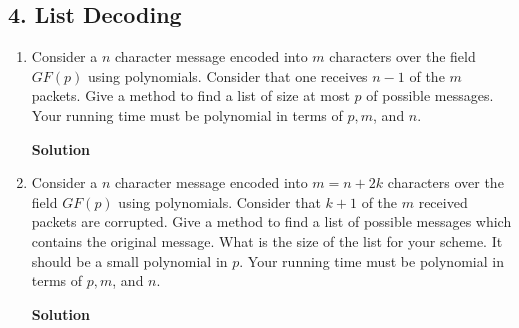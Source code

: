 \documentclass{article}\usepackage{amsmath,amssymb,amsthm,tikz,tkz-graph,color,chngpage,soul,hyperref,csquotes,graphicx,floatrow}\newcommand*{\QEDB}{\hfill\ensuremath{\square}}\newtheorem*{prop}{Proposition}\renewcommand{\theenumi}{\alph{enumi}}\usepackage[shortlabels]{enumitem}\usepackage[nobreak=true]{mdframed}\usetikzlibrary{matrix,calc}\MakeOuterQuote{"}\usepackage[margin=0.75in]{geometry} \newtheorem{theorem}{Theorem}
\begin{document}
\subsection*{4. List Decoding}
\begin{enumerate}
\item Consider a $n$ character message encoded into $m$ characters over the field $GF(p)$ using polynomials. Consider that one receives $n - 1$ of the $m$ packets. Give a method to find a list of size at most $p$ of possible messages. Your running time must be polynomial in terms of $p, m$, and $n$.
\begin{mdframed}
\textbf{Solution}

\end{mdframed}
\item Consider a $n$ character message encoded into $m = n + 2k$ characters over the field $GF(p)$ using polynomials. Consider that $k + 1$ of the $m$ received packets are corrupted. Give a method to find a list of possible messages which contains the original message. What is the size of the list for your scheme. It should be a small polynomial in $p$. Your running time must be polynomial in terms of $p, m$, and $n$.
\begin{mdframed}
\textbf{Solution}

\end{mdframed}
\end{enumerate}
\clearpage

\end{document}
